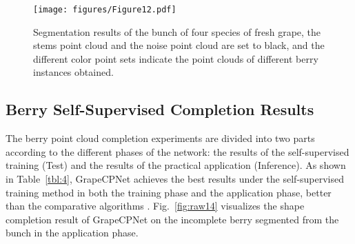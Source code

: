 \documentclass[12pt]{article}
\begin{document}
\begin{figure}[hbt!]
    \centering
    \texttt{[image: figures/Figure12.pdf]}
    \caption{Segmentation results of the bunch of four species of fresh grape, the stems point cloud and the noise point cloud are set to black, and the different color point sets indicate the point clouds of different berry instances obtained.}
    \label{fig:raw13}
\end{figure}

\subsection{Berry Self-Supervised Completion Results}
\label{sec:32}

The berry point cloud completion experiments are divided into two parts according to the different phases of the network: 
the results of the self-supervised training (Test) and the results of the practical application (Inference).
As shown in Table~\ref{tbl:4}, 
GrapeCPNet achieves the best results under the self-supervised training method in both the training phase and the application phase, better than the comparative algorithms . 
Fig.~\ref{fig:raw14} visualizes the shape completion result of GrapeCPNet on the incomplete berry segmented from the bunch in the application phase.
\end{document}
